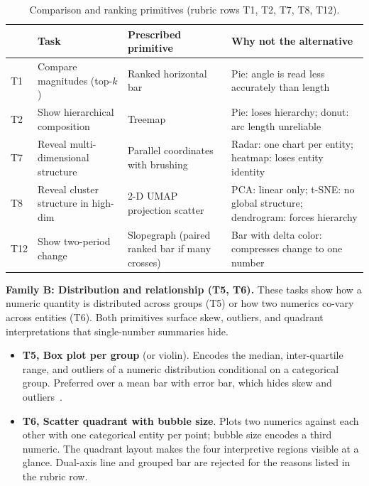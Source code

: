 \begin{table}[!htbp]
\centering
\caption{Comparison and ranking primitives (rubric rows T1, T2, T7, T8, T12).}
\label{tab:foundations:rubric:compare}
\footnotesize
\renewcommand{\arraystretch}{1.25}
\begin{tabularx}{\linewidth}{p{0.5cm} p{4.2cm} X X}
\hline
& \textbf{Task} & \textbf{Prescribed primitive} & \textbf{Why not the alternative} \\
\hline
T1  & Compare magnitudes (top-$k$)         & Ranked horizontal bar                                          & Pie: angle is read less accurately than length \\
T2  & Show hierarchical composition         & Treemap                                                        & Pie: loses hierarchy; donut: arc length unreliable \\
T7  & Reveal multi-dimensional structure     & Parallel coordinates with brushing                             & Radar: one chart per entity; heatmap: loses entity identity \\
T8  & Reveal cluster structure in high-dim   & 2-D UMAP projection scatter~\cite{umap}                        & PCA: linear only; t-SNE: no global structure; dendrogram: forces hierarchy \\
T12 & Show two-period change                 & Slopegraph (paired ranked bar if many crosses)                 & Bar with delta color: compresses change to one number \\
\hline
\end{tabularx}
\end{table}

\textbf{Family B: Distribution and relationship (T5, T6).}
These tasks show how a numeric quantity is distributed across groups
(T5) or how two numerics co-vary across entities (T6). Both
primitives surface skew, outliers, and quadrant interpretations that
single-number summaries hide.

\begin{itemize}
\item \textbf{T5, Box plot per group} (or violin). Encodes the
median, inter-quartile range, and outliers of a numeric distribution
conditional on a categorical group. Preferred over a mean bar with
error bar, which hides skew and outliers~\cite{wilke2019}.
\item \textbf{T6, Scatter quadrant with bubble size}. Plots two
numerics against each other with one categorical entity per point;
bubble size encodes a third numeric. The quadrant layout makes the
four interpretive regions visible at a glance. Dual-axis line and
grouped bar are rejected for the reasons listed in the rubric row.
\end{itemize}

